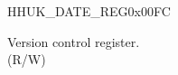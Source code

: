 \begin{register}{H}{HUK\_DATE\_REG}{0x00FC}\label{regdesc:HUKDATEREG}
%
%
\regnewline%
\begin{regdesc}\begin{reglist}
\label{fielddesc:HUKDATE}\item [HUK\_DATE] Version control register. \\
(R/W)
\end{reglist}\end{regdesc}
\end{register}


